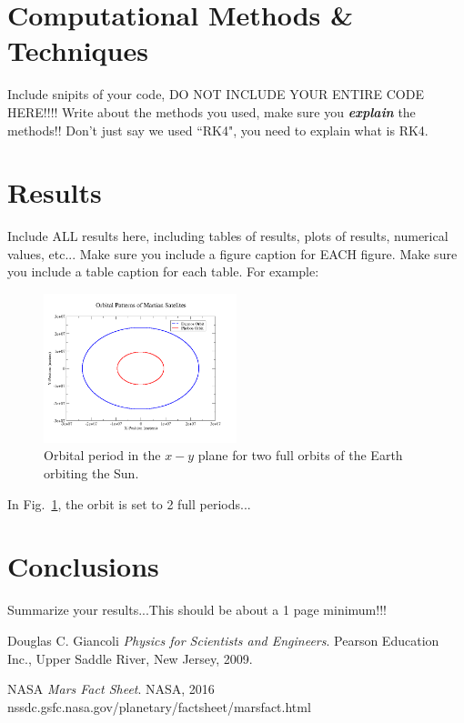 \documentclass[11pt]{article}
\begin{document}
\section{Computational Methods \& Techniques}
\noindent Include snipits of your code, DO NOT INCLUDE YOUR ENTIRE CODE HERE!!!!  
Write about the methods you used, make sure you \textbf{\textit{explain}} the methods!!  Don't
just say we used ``RK4", you need to explain what is RK4.

\section{Results}
\noindent Include ALL results here, including tables of results, plots of results, numerical values, etc...
Make sure you include a figure caption for EACH figure.  Make sure you include a table caption for each table.
For example:
\begin{figure}[ht]
\centering
\includegraphics[width=0.5\textwidth, angle =-90]{../presentation/orbits}
\caption{Orbital period in the $x-y$ plane for two full orbits of the Earth orbiting the Sun.}
\label{fig:graph}
\end{figure}
\noindent In Fig.~\ref{fig:graph}, the orbit is set to 2 full periods...

\section{Conclusions}
\noindent Summarize your results...This should be about a 1 page minimum!!!


\begin{thebibliography}{99}

Douglas C. Giancoli
\textit{Physics for Scientists and Engineers}. 
Pearson Education Inc., Upper Saddle River, New Jersey, 2009.

NASA
\textit{Mars Fact Sheet}. 
NASA, 2016
nssdc.gsfc.nasa.gov/planetary/factsheet/marsfact.html

\end{thebibliography}
\end{document}

